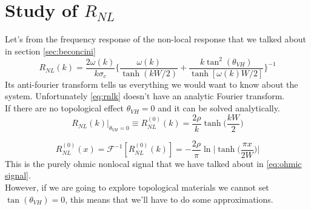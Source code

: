 \section{Study of $R_{NL}$}
Let's from the frequency response of the non-local response that we talked about in section \ref{sec:beconcini} \cite{Beconcini_2016}
\begin{equation}
    R_{NL}(k)=\frac{2\omega(k)}{k\sigma_c}
    \bigg\{
        \frac{\omega(k)}{\tanh(kW/2)} + \frac{k\tan^2(\theta_{VH})}{\tanh[\omega(k)W/2]}    
    \bigg\}^{-1}
    \label{eq:rnlk}
\end{equation}
Its anti-fourier transform tells us everything we would want to know about the system. Unfortunately \ref{eq:rnlk} doesn't have an analytic Fourier transform.\\ If there are no topological effect $\theta_{VH}=0$ and it can be solved analytically.
\begin{equation}
    R_{NL}(k)|_{\theta_{VH}=0}\equiv R_{NL}^{(0)}(k)=
    \frac{2\rho}k\tanh\bigg(\frac{kW}2\bigg)
    \label{eq:ohmick}
\end{equation}

\begin{equation}
    R_{NL}^{(0)}(x)=
    \mathcal F^{-1}\left[R_{NL}^{(0)}(k) \right]=
    -\frac{2\rho}\pi\ln\bigg |\tanh \Big(\frac{\pi x}{2W}\Big)\bigg |
    \label{eq:ohmic signal2}
\end{equation}
This is the purely ohmic nonlocal signal that we have talked about in \ref{eq:ohmic signal}.\\
However, if we are going to explore topological materials we cannot set $\tan (\theta_{VH})=0$, this means that we'll have to do some approximations.

